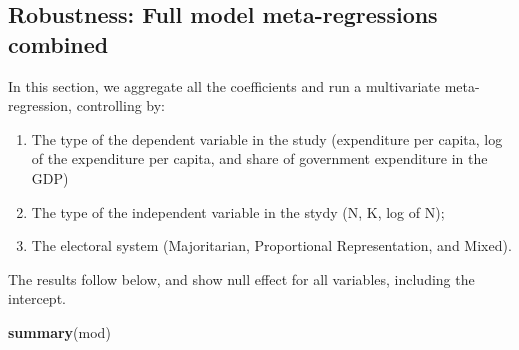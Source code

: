 \documentclass[
]{article}
\newenvironment{Shaded}{\begin{snugshade}}{\end{snugshade}}
\newcommand{\KeywordTok}[1]{\textcolor[rgb]{0.13,0.29,0.53}{\textbf{#1}}}
\newcommand{\NormalTok}[1]{#1}
\providecommand{\tightlist}{%
  \setlength{\itemsep}{0pt}\setlength{\parskip}{0pt}}
\begin{document}
\hypertarget{robustness-full-model-meta-regressions-combined}{%
\subsection{Robustness: Full model meta-regressions
combined}\label{robustness-full-model-meta-regressions-combined}}

In this section, we aggregate all the coefficients and run a
multivariate meta-regression, controlling by:

\begin{enumerate}
\def\labelenumi{\arabic{enumi}.}
\tightlist
\item
  The type of the dependent variable in the study (expenditure per
  capita, log of the expenditure per capita, and share of government
  expenditure in the GDP)
\item
  The type of the independent variable in the stydy (N, K, log of N);
\item
  The electoral system (Majoritarian, Proportional Representation, and
  Mixed).
\end{enumerate}

The results follow below, and show null effect for all variables,
including the intercept.

\begin{Shaded}
\begin{Highlighting}[]
\KeywordTok{summary}\NormalTok{(mod)}
\end{Highlighting}
\end{Shaded}
\end{document}
